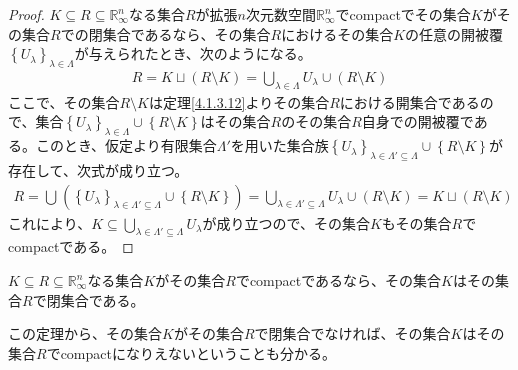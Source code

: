 \documentclass[dvipdfmx]{jsarticle}
\begin{document}
\begin{proof}
$K \subseteq R \subseteq \mathbb{R}_{\infty}^{n}$なる集合$R$が拡張$n$次元数空間$\mathbb{R}_{\infty}^{n}$でcompactでその集合$K$がその集合$R$での閉集合であるなら、その集合$R$におけるその集合$K$の任意の開被覆$\left\{ U_{\lambda} \right\}_{\lambda \in \varLambda}$が与えられたとき、次のようになる。
\begin{align*}
R = K \sqcup (R \setminus K) = \bigcup_{\lambda \in \varLambda} U_{\lambda} \cup (R \setminus K)
\end{align*}
ここで、その集合$R \setminus K$は定理\ref{4.1.3.12}よりその集合$R$における開集合であるので、集合$\left\{ U_{\lambda} \right\}_{\lambda \in \varLambda} \cup \left\{ R \setminus K \right\}$はその集合$R$のその集合$R$自身での開被覆である。このとき、仮定より有限集合$\varLambda'$を用いた集合族$\left\{ U_{\lambda} \right\}_{\lambda \in \varLambda' \subseteq \varLambda } \cup \left\{ R \setminus K \right\}$が存在して、次式が成り立つ。
\begin{align*}
R = \bigcup_{} \left( \left\{ U_{\lambda} \right\}_{\lambda \in \varLambda' \subseteq \varLambda } \cup \left\{ R \setminus K \right\} \right) = \bigcup_{\lambda \in \varLambda' \subseteq \varLambda} U_{\lambda} \cup (R \setminus K) = K \sqcup (R \setminus K)
\end{align*}
これにより、$K \subseteq \bigcup_{\lambda \in \varLambda' \subseteq \varLambda} U_{\lambda}$が成り立つので、その集合$K$もその集合$R$でcompactである。
\end{proof}
\begin{thm}\label{4.1.7.2}
$K \subseteq R \subseteq \mathbb{R}_{\infty}^{n}$なる集合$K$がその集合$R$でcompactであるなら、その集合$K$はその集合$R$で閉集合である。
\end{thm}\par
この定理から、その集合$K$がその集合$R$で閉集合でなければ、その集合$K$はその集合$R$でcompactになりえないということも分かる。
\end{document}
